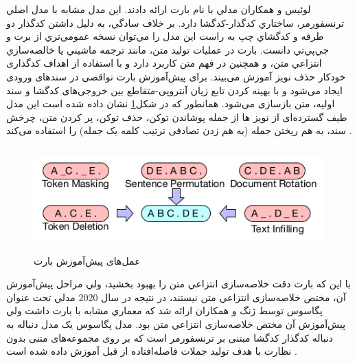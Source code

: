 لوئيس و همكاران مدلي با نام بارت 
ارائه دادند. اين مدل مشابه با مدل اصلي ترنسفورمر، ساختاري كدگذار-کدگشا دارد. بر خلاف سادگي، به دليل داشتن كدگذار دو طرفه و كدگشاي چپ به راست اين مدل را مي‌توان نسخه عمومي‌تري از برت و جي‌پي‌تي 
 دانست. بارت در عمليات توليد متن، مانند ترجمه ماشيني يا خالصه‌سازي انتزاعي متن، و همچنين در فهم متن كاربرد دارد و با استفاده از اهداف کدگذاری خودکار حذف نویز آموزش می‌بیند. برای پیش‌آموزش بارت نواقصی در سندهای ورودی ایجاد می‌شود و با بهینه کردن تابع زیان آنتروپی-متقاطع 
  بین خروجی‌های کدگشا و سند اولیه، متن بازسازی می‌شود. همانطور که در شکل\ref{fig:bart} نشان داده شده است این مدل طیف گسترده‌ای از نویز ‌ها از جمله پوشاندن توکن، حذف توکن، پر کردن متن، چرخش سند، به هم ریختن جمله (به هم زدن تصادفی ترتیب کلمه یک جمله) را استفاده  می‌کند \cite{lewis-etal-2020-bart}. 
\begin{figure}[!h]
	\begin{center}
		\includegraphics[height=4cm]{bart2.png}
	\end{center}
	\caption{ عمل‌های پیش‌آموزش بارت \cite{lewis-etal-2020-bart}}
	\label{fig:bart}
	\medskip
	\small
\end{figure}


با اين كه بارت دقت خلاصه‌سازی انتزاعي متن را بهبود بخشيد، ولي مراحل پيش‌آموزش آن، مختص خلاصه‌سازی انتزاعي متن نیستند، در نتیجه در سال 2020 مدلي تحت عنوان پگاسوس
توسط ژنگ و همكاران ارائه شد كه معماري مشابه با بارت داشت ولي پيش‌آموزش آن مختص خلاصه‌سازی انتزاعي متن بود.
مدل پگاسوس
یک مدل دنباله به دنباله کدگذار کدگشا مبتنی بر ترنسفورمر است که بر روی مجموعه‌های متنی بدون نظارت با هدف تولید جملات فاصله‌افتاده
از قبل آموزش داده شده است \cite{zhang2020pegasus}.

